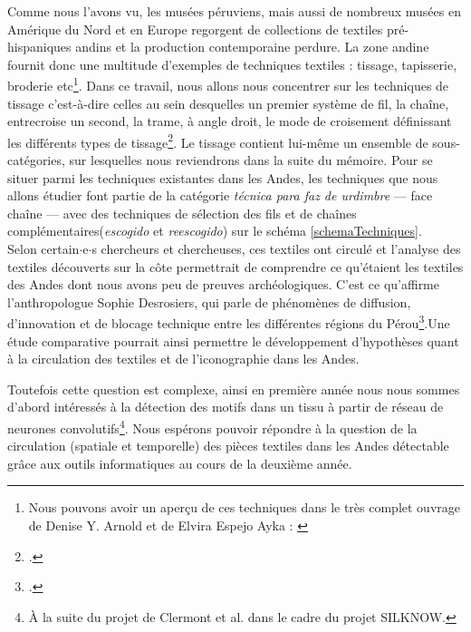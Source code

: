 \documentclass[a4paper, twoside, 12pt]{book}
\newcommand{\inclusives}[1]{$\cdot${#1}$\cdot${s}}
\begin{document}
Comme nous l'avons vu, les musées péruviens, mais aussi de nombreux musées en Amérique du Nord et en Europe regorgent de collections de textiles pré-hispaniques andins et la production contemporaine perdure. La zone andine fournit donc une multitude d'exemples de techniques textiles : tissage, tapisserie, broderie etc\footnote{Nous pouvons avoir un aperçu de ces techniques dans le très complet ouvrage de Denise Y. Arnold et de Elvira Espejo Ayka : \cite{arnoldCienciaTejerAndes2019}}.
Dans ce travail, nous allons nous concentrer sur les techniques de tissage c'est-à-dire celles au sein desquelles \og un premier système de fil, la chaîne, entrecroise un second, la trame, à angle droit, le mode de croisement définissant les différents types de tissage\footcite[p.~17]{albersTissage2021}.\fg \: Le tissage contient lui-même un ensemble de sous-catégories, sur lesquelles nous reviendrons dans la suite du mémoire. Pour se situer parmi les techniques existantes dans les Andes, les techniques que nous allons étudier font partie de la catégorie \textit{técnica para faz de urdimbre} --- face chaîne --- avec des techniques de sélection des fils et de chaînes complémentaires(\textit{escogido} et \textit{reescogido}) sur le schéma \ref{schemaTechniques}.\\

Selon certain\inclusives{e} chercheurs et chercheuses, ces textiles ont circulé et l'analyse des textiles découverts sur la côte permettrait de comprendre ce qu'étaient les textiles des Andes dont nous avons peu de preuves archéologiques. C'est ce qu'affirme l'anthropologue Sophie Desrosiers, qui parle de \og phénomènes de diffusion, d'innovation et de blocage technique \fg \:entre les différentes régions du Pérou\footcite[p.~264]{desrosiersTechniquesTissageOntelles2010}.\fg \:Une étude comparative pourrait ainsi permettre le développement d'hypothèses quant à la circulation des textiles et de l'iconographie dans les Andes. 

Toutefois cette question est complexe, ainsi en première année nous nous sommes d'abord intéressés à la détection des motifs dans un tissu à partir de réseau de neurones convolutifs\footnote{À la suite du projet de Clermont et al. dans le cadre du projet SILKNOW.}. Nous espérons pouvoir répondre à la question de la circulation (spatiale et temporelle) des pièces textiles dans les Andes détectable grâce aux outils informatiques au cours de la deuxième année. \\
\end{document}
